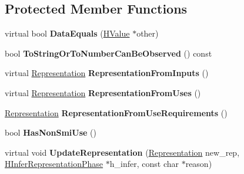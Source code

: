 \subsection*{Protected Member Functions}
\begin{DoxyCompactItemize}
\item 
virtual bool {\bfseries Data\+Equals} (\hyperlink{classv8_1_1internal_1_1_h_value}{H\+Value} $\ast$other)\hypertarget{classv8_1_1internal_1_1_h_value_a4638f99e18888fefa1c5507f697a1688}{}\label{classv8_1_1internal_1_1_h_value_a4638f99e18888fefa1c5507f697a1688}

\item 
bool {\bfseries To\+String\+Or\+To\+Number\+Can\+Be\+Observed} () const \hypertarget{classv8_1_1internal_1_1_h_value_aca9cf9d2cd1f8ac80902f6cb10ca2da7}{}\label{classv8_1_1internal_1_1_h_value_aca9cf9d2cd1f8ac80902f6cb10ca2da7}

\item 
virtual \hyperlink{classv8_1_1internal_1_1_representation}{Representation} {\bfseries Representation\+From\+Inputs} ()\hypertarget{classv8_1_1internal_1_1_h_value_a8f12630b6ec6b60327b96eb4341a3e54}{}\label{classv8_1_1internal_1_1_h_value_a8f12630b6ec6b60327b96eb4341a3e54}

\item 
virtual \hyperlink{classv8_1_1internal_1_1_representation}{Representation} {\bfseries Representation\+From\+Uses} ()\hypertarget{classv8_1_1internal_1_1_h_value_ae2750cf90b326668da92608f7faaab07}{}\label{classv8_1_1internal_1_1_h_value_ae2750cf90b326668da92608f7faaab07}

\item 
\hyperlink{classv8_1_1internal_1_1_representation}{Representation} {\bfseries Representation\+From\+Use\+Requirements} ()\hypertarget{classv8_1_1internal_1_1_h_value_a6f41bd071712e658e9689831cb22f4bb}{}\label{classv8_1_1internal_1_1_h_value_a6f41bd071712e658e9689831cb22f4bb}

\item 
bool {\bfseries Has\+Non\+Smi\+Use} ()\hypertarget{classv8_1_1internal_1_1_h_value_a068705f1997b6948e980a4528a212b09}{}\label{classv8_1_1internal_1_1_h_value_a068705f1997b6948e980a4528a212b09}

\item 
virtual void {\bfseries Update\+Representation} (\hyperlink{classv8_1_1internal_1_1_representation}{Representation} new\+\_\+rep, \hyperlink{classv8_1_1internal_1_1_h_infer_representation_phase}{H\+Infer\+Representation\+Phase} $\ast$h\+\_\+infer, const char $\ast$reason)\hypertarget{classv8_1_1internal_1_1_h_value_aef5debc65c52d39fc1cbabc925b7498a}{}\label{classv8_1_1internal_1_1_h_value_aef5debc65c52d39fc1cbabc925b7498a}


\end{DoxyCompactItemize}
